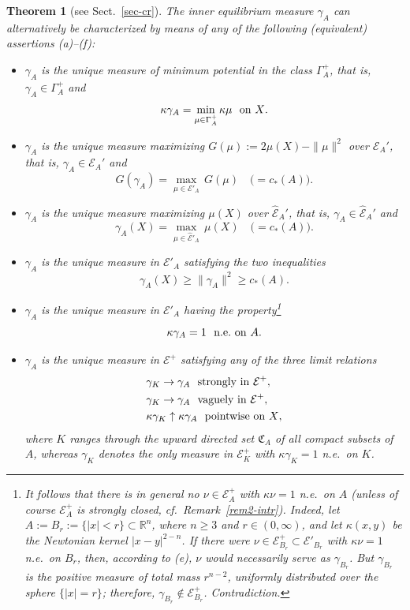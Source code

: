 \documentclass[12pt,a4paper,reqno]{amsart} %
\theoremstyle{lause}
\theoremstyle{maaritelma}
\theoremstyle{lause}
\newtheorem{theorem}{Theorem}[section]
\theoremstyle{maaritelma}
\numberwithin{equation}{section}
\begin{document}
\begin{theorem}[{\rm see Sect.~\ref{sec-cr}}]\label{th-ex} The inner equilibrium measure\/ $\gamma_A$ can alternatively be characterized by means of any of the following\/ {\rm(}equivalent\/{\rm)} assertions\/ {\rm(a)--(f)}:
\begin{itemize}\item[{\rm(a)}]$\gamma_A$ is the unique measure of minimum potential in the class\/ $\Gamma^+_A$, that is, $\gamma_A\in\Gamma^+_A$ and
\[\kappa\gamma_A=\min_{\mu\in\Gamma^+_A}\kappa\mu\text{ \ on\/ $X$.}\]
\item[{\rm(b)}]$\gamma_A$ is the unique measure maximizing\/ $G(\mu):=2\mu(X)-\|\mu\|^2$ over\/ $\mathcal E_A'$, that is, $\gamma_A\in\mathcal E_A'$ and
\[G(\gamma_A)=\max_{\mu\in\mathcal E'_A}\,G(\mu)\quad\bigl({}=c_*(A)\bigr).\]
\item[{\rm(c)}]$\gamma_A$ is the unique measure maximizing\/ $\mu(X)$ over\/ $\widehat{\mathcal E}_A'$, that is, $\gamma_A\in\widehat{\mathcal E}_A'$ and
\[\gamma_A(X)=\max_{\mu\in\widehat{\mathcal E}'_A}\,\mu(X)\quad\bigl({}=c_*(A)\bigr).\]
\item[{\rm(d)}]$\gamma_A$ is the unique measure in\/ $\mathcal E'_A$ satisfying the two inequalities
    \[\gamma_A(X)\geqslant\|\gamma_A\|^2\geqslant c_*(A).\]
\item[{\rm(e)}]$\gamma_A$ is the unique measure in\/ $\mathcal E'_A$ having the property\/\footnote{It follows that there is in general no $\nu\in\mathcal E^+_A$ with $\kappa\nu=1$ n.e.\ on $A$ (unless of course $\mathcal E^+_A$ is strongly closed, cf.\ Remark~\ref{rem2-intr}). Indeed, let $A:=B_r:=\{|x|<r\}\subset\mathbb R^n$, where $n\geqslant3$ and $r\in(0,\infty)$, and let $\kappa(x,y)$ be the Newtonian kernel $|x-y|^{2-n}$. If there were $\nu\in\mathcal E^+_{B_r}\subset\mathcal E'_{B_r}$ with $\kappa\nu=1$ n.e.\ on $B_r$, then, according to (e), $\nu$ would necessarily serve as $\gamma_{B_r}$. But $\gamma_{B_r}$ is the positive measure of total mass $r^{n-2}$, uniformly distributed over the sphere $\{|x|=r\}$; therefore, $\gamma_{B_r}\not\in\mathcal E^+_{B_r}$. Contradiction.\label{Foot}}
    \[\kappa\gamma_A=1\text{ \ n.e.\ on\/ $A$.}\]
\item[{\rm(f)}]$\gamma_A$ is the unique measure in\/ $\mathcal E^+$ satisfying any of the three limit relations
    \begin{align*}&\gamma_K\to\gamma_A\text{ \ strongly in\/ $\mathcal E^+$},\\
    &\gamma_K\to\gamma_A\text{ \ vaguely in\/ $\mathcal E^+$},\\
    &\kappa\gamma_K\uparrow\kappa\gamma_A\text{ \ pointwise on\/ $X$},\end{align*}
    where\/ $K$ ranges through the upward directed set\/ $\mathfrak C_A$ of all compact subsets of\/ $A$, whereas\/ $\gamma_K$ denotes the only measure in\/ $\mathcal E^+_K$ with\/ $\kappa\gamma_K=1$ n.e.\ on\/ $K$.
\end{itemize}\end{theorem}
\end{document}
